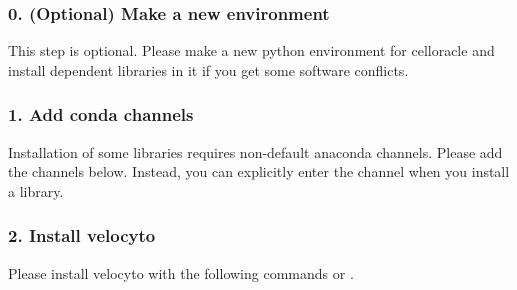 \documentclass[letterpaper,10pt,english]{sphinxmanual}
\begin{document}
\subsubsection{0. (Optional) Make a new environment}
\label{\detokenize{installation/index:optional-make-a-new-environment}}
This step is optional. Please make a new python environment for celloracle and install dependent libraries in it if you get some software conflicts.

\begin{sphinxVerbatim}[commandchars=\\\{\}]
    
  
\end{sphinxVerbatim}


\subsubsection{1. Add conda channels}
\label{\detokenize{installation/index:add-conda-channels}}
Installation of some libraries requires non-default anaconda channels. Please add the channels below. Instead, you can explicitly enter the channel when you install a library.

\begin{sphinxVerbatim}[commandchars=\\\{\}]
    
    
    
\end{sphinxVerbatim}


\subsubsection{2. Install velocyto}
\label{\detokenize{installation/index:install-velocyto}}
Please install velocyto with the following commands or  .

\begin{sphinxVerbatim}[commandchars=\\\{\}]
            
\end{sphinxVerbatim}
\end{document}
